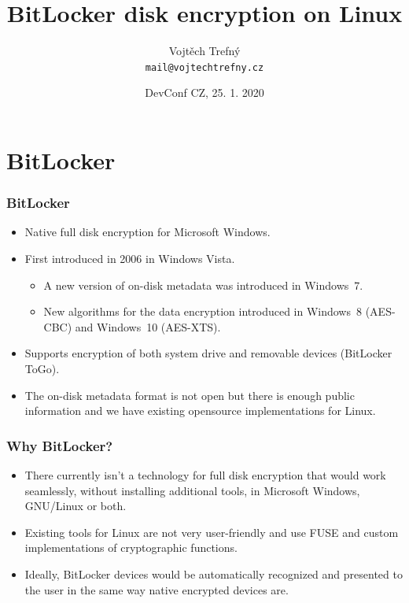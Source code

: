 \documentclass{beamer}
\title[BitLocker disk encryption on Linux]{BitLocker disk encryption on Linux}
\author{Vojtěch Trefný\\ \small \texttt{mail@vojtechtrefny.cz}\\}
\date{DevConf CZ, 25. 1. 2020\\}
\institute{\faTwitter\, \href{https://twitter.com/vojtechtrefny}{twitter.com/vojtechtrefny} \\ \faGithub\, \href{https://github.com/vojtechtrefny}{github.com/vojtechtrefny} \\ \faGitlab\ \href{https://gitlab.com/vtrefny}{gitlab.com/vtrefny}}
\begin{document}
{ 
\begin{frame}
\titlepage
\end{frame}
}


\section{BitLocker}

\begin{frame}
	\frametitle{BitLocker}

	\begin{block}{}
		\begin{itemize}
			\item Native full disk encryption for Microsoft Windows.
			\item First introduced in 2006 in Windows Vista.\footnotemark
			\begin{itemize}
				\item A new version of on-disk metadata was introduced in Windows~7.
				\item New algorithms for the data encryption introduced in Windows~8 (AES-CBC) and Windows~10 (AES-XTS).
			\end{itemize}
			\item Supports encryption of both system drive and removable devices (BitLocker ToGo).
			\item The on-disk metadata format is not open but there is enough public information and we have existing opensource implementations for Linux\footnotemark.
		\end{itemize}
	\end{block}
\end{frame}

\begin{frame}
	\frametitle{Why BitLocker?}
	
	\begin{block}{}
		\begin{itemize}
			\item There currently isn’t a technology for full disk encryption that would work seamlessly,
without installing additional tools, in Microsoft Windows, GNU/Linux or both.
			\item Existing tools for Linux are not very user-friendly and use FUSE and custom implementations of cryptographic functions.
			\item Ideally, BitLocker devices would be automatically recognized and presented to the user in the same way native encrypted devices are.
		\end{itemize}
	\end{block}
\end{frame}
\end{document}
